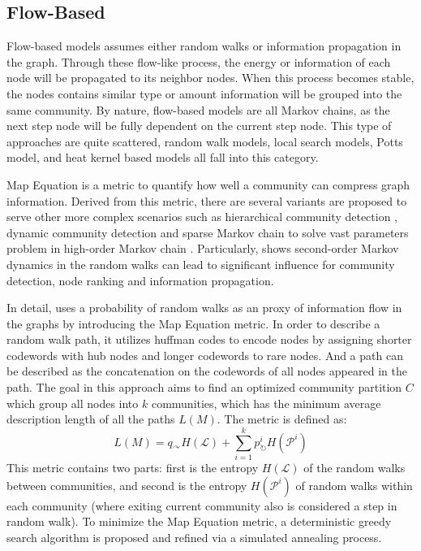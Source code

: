 \subsection{Flow-Based}
Flow-based models assumes either random walks or information propagation in the graph. Through these flow-like process, the energy or information of each node will be propagated to its neighbor nodes. When this process becomes stable, the nodes contains similar type or amount information will be grouped into the same community. By nature, flow-based models are all Markov chains, as the next step node will be fully dependent on the current step node.  This type of approaches are quite scattered, random walk models, local search models, Potts model, and heat kernel based models all fall into this category. 

Map Equation \cite{rosvall2008maps} is a metric to quantify how well a community can compress graph information. Derived from this metric, there are several variants are proposed to serve other more complex scenarios such as hierarchical community detection \cite{rosvall2011multilevel}, dynamic community detection \cite{rosvall2014memory} and sparse Markov chain to solve vast parameters problem in  high-order Markov chain \cite{persson2016maps}. Particularly, \cite{rosvall2014memory} shows second-order Markov dynamics in the random walks can lead to significant influence for community detection, node ranking and information propagation.  

In detail, \cite{rosvall2008maps} uses a probability of random walks as an proxy of information flow in the graphs by introducing the Map Equation metric. In order to describe a random walk path, it utilizes huffman codes to encode nodes by assigning shorter codewords with hub nodes and longer codewords to rare nodes. And a path can be described as the concatenation on the codewords of all nodes appeared in the path. The goal in this approach aims to find an optimized community partition $C$ which group all nodes into $k$ communities, which has the minimum average description length of all the paths $L(M)$. The metric is defined as:
\begin{equation} 
 L(M) = q_{\curvearrowright}H(\mathcal{L})+\sum_{i=1}^{k} \textit{$p_{\circlearrowright}^{i}$}H(\textit{$\mathcal{P}^{i}$}) 
\end{equation}
This metric contains two parts: first is the entropy $H(\mathcal{L})$ of the random walks between communities, and second is the entropy $H(\mathcal{P}^{i}) $ of random walks within each community (where exiting current community also is considered a step in random walk). To minimize the Map Equation metric, a deterministic greedy search algorithm is proposed and refined via a simulated annealing process. 

